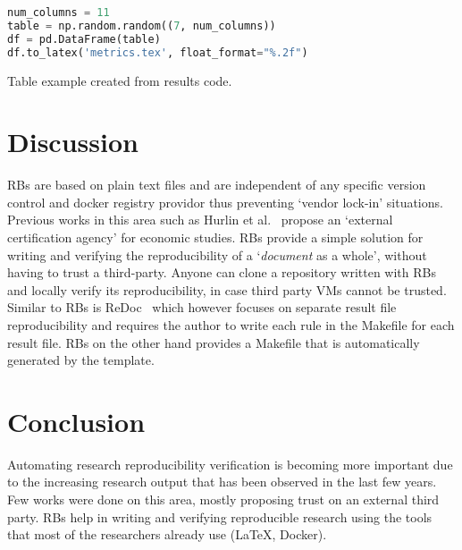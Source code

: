 \documentclass[journal]{IEEEtran}
\begin{document}
\begin{lstlisting}[language=python, style=lststyle, caption={Convert Pandas DataFrame to \LaTeX\ table.}, captionpos=b]
num_columns = 11
table = np.random.random((7, num_columns))
df = pd.DataFrame(table)
df.to_latex('metrics.tex', float_format="%.2f")
\end{lstlisting}

\begin{table}[h]
	\centering
	\caption{Table example created from results code.}
	\label{table:table}
	\setlength\tabcolsep{4.2pt}
	\scalebox{0.72}{}
\end{table}

\section{Discussion}
RBs are based on plain text files and are independent of any specific version control and docker registry providor thus preventing `vendor lock-in' situations.
Previous works in this area such as Hurlin et al.~\cite{hurlin2019reproducibility} propose an `external certification agency' for economic studies.
RBs provide a simple solution for writing and verifying the reproducibility of a `\textit{document} as a whole', without having to trust a third-party.
Anyone can clone a repository written with RBs and locally verify its reproducibility, in case third party VMs cannot be trusted.
Similar to RBs is ReDoc~\cite{schwab2000making} which however focuses on separate result file reproducibility and requires the author to write each rule in the Makefile for each result file.
RBs on the other hand provides a Makefile that is automatically generated by the template.

\section{Conclusion}
Automating research reproducibility verification is becoming more important due to the increasing research output that has been observed in the last few years.
Few works were done on this area, mostly proposing trust on an external third party.
RBs help in writing and verifying reproducible research using the tools that most of the researchers already use (\LaTeX, Docker).



\end{document}
